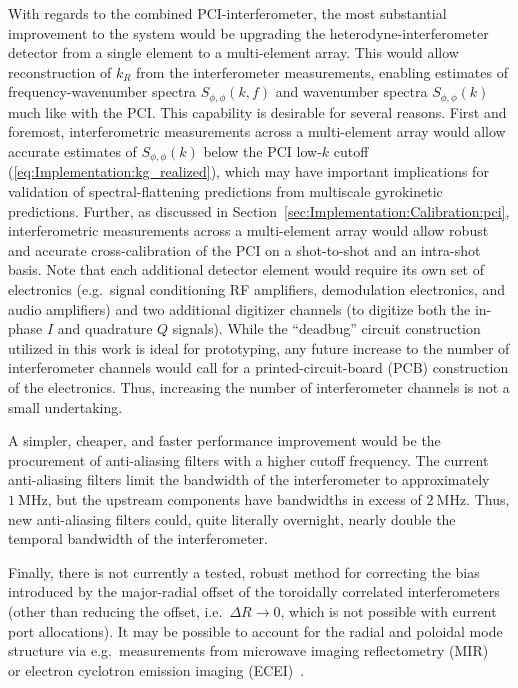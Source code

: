 With regards to the combined PCI-interferometer,
the most substantial improvement to the system
would be upgrading the heterodyne-interferometer detector
from a single element to a multi-element array.
This would allow reconstruction of $k_R$
from the interferometer measurements,
enabling estimates of
frequency-wavenumber spectra $S_{\phi,\phi}(k,f)$ and
wavenumber spectra $S_{\phi,\phi}(k)$
much like with the PCI.
This capability is desirable for several reasons.
First and foremost,
interferometric measurements across a multi-element array
would allow accurate estimates of $S_{\phi,\phi}(k)$
below the PCI low-$k$ cutoff
(\ref{eq:Implementation:kg_realized}), which
may have important implications for
validation of spectral-flattening predictions
from multiscale gyrokinetic predictions.
Further, as discussed in
Section~\ref{sec:Implementation:Calibration:pci},
interferometric measurements across a multi-element array
would allow robust and accurate
cross-calibration of the PCI
on a shot-to-shot and an intra-shot basis.
Note that each additional detector element
would require its own set of electronics
(e.g.\ signal conditioning RF amplifiers,
demodulation electronics, and
audio amplifiers) and
two additional digitizer channels
(to digitize both the in-phase $I$ and quadrature $Q$ signals).
While the ``deadbug'' circuit construction utilized in this work
is ideal for prototyping,
any future increase to the number of interferometer channels
would call for a printed-circuit-board (PCB) construction
of the electronics.
Thus, increasing the number of interferometer channels
is not a small undertaking.

A simpler, cheaper, and faster performance improvement
would be the procurement of anti-aliasing filters
with a higher cutoff frequency.
The current anti-aliasing filters
limit the bandwidth of the interferometer to
approximately $\SI{1}{\mega\hertz}$, but
the upstream components have bandwidths
in excess of $\SI{2}{\mega\hertz}$.
Thus, new anti-aliasing filters could,
quite literally overnight,
nearly double the temporal bandwidth of the interferometer.

Finally, there is not currently a tested, robust method
for correcting the bias introduced by
the major-radial offset of the toroidally correlated interferometers
(other than reducing the offset, i.e.\ $\Delta R \rightarrow 0$,
which is not possible with current port allocations).
It may be possible to account for the radial and poloidal mode structure
via e.g.\ measurements from
microwave imaging reflectometry (MIR)~\cite{muscatello_rsi14} or
electron cyclotron emission imaging (ECEI)~\cite{tobias_rsi10}.

